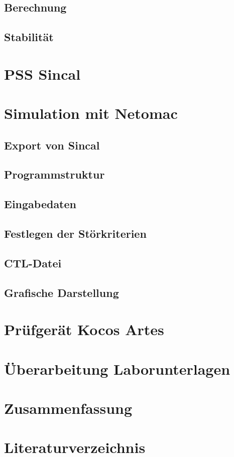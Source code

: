 \documentclass{scrartcl}
\begin{document}
\begin{onehalfspace}
\subsection{Berechnung}

\subsection{Stabilität}

\section{PSS Sincal}

\section{Simulation mit Netomac}
\subsection{Export von Sincal}
\subsection{Programmstruktur}
\subsection{Eingabedaten}
\subsection{Festlegen der Störkriterien}
\subsection{CTL-Datei}
\subsection{Grafische Darstellung}

\section{Prüfgerät Kocos Artes}

\section{Überarbeitung Laborunterlagen}
\section{Zusammenfassung}

\newpage
{}
\setcounter{page}{1}
\section{Literaturverzeichnis}



\end{onehalfspace}
\end{document}
